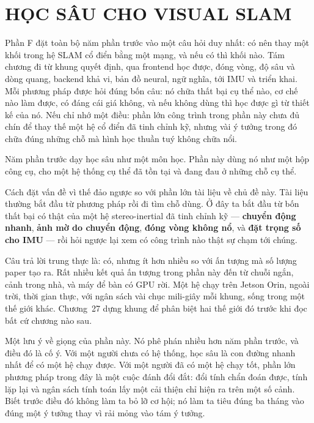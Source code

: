 \documentclass[../deep_learning.tex]{subfiles}
\begin{document}
\part{HỌC SÂU CHO VISUAL SLAM}
\begin{tomtat}
Phần F đặt toàn bộ năm phần trước vào một câu hỏi duy nhất: có nên thay một khối trong hệ SLAM cổ điển bằng một mạng, và nếu có thì khối nào. Tám chương đi từ khung quyết định, qua frontend học được, đóng vòng, độ sâu và dòng quang, backend khả vi, bản đồ neural, ngữ nghĩa, tới IMU và triển khai. Mỗi phương pháp được hỏi đúng bốn câu: nó chữa thất bại cụ thể nào, cơ chế nào làm được, có đáng cái giá không, và nếu không dùng thì học được gì từ thiết kế của nó. Nếu chỉ nhớ một điều: phần lớn công trình trong phần này chưa đủ chín để thay thế một hệ cổ điển đã tinh chỉnh kỹ, nhưng vài ý tưởng trong đó chữa đúng những chỗ mà hình học thuần tuý không chữa nổi.
\end{tomtat}

Năm phần trước dạy học sâu như một môn học. Phần này dùng nó như một hộp công cụ, cho một hệ thống cụ thể đã tồn tại và đang đau ở những chỗ cụ thể.

Cách đặt vấn đề vì thế đảo ngược so với phần lớn tài liệu về chủ đề này. Tài liệu thường bắt đầu từ phương pháp rồi đi tìm chỗ dùng. Ở đây ta bắt đầu từ bốn thất bại có thật của một hệ stereo-inertial đã tinh chỉnh kỹ --- \textbf{chuyển động nhanh}, \textbf{ảnh mờ do chuyển động}, \textbf{đóng vòng không nổ}, và \textbf{đặt trọng số cho IMU} --- rồi hỏi ngược lại xem có công trình nào thật sự chạm tới chúng.

Câu trả lời trung thực là: có, nhưng ít hơn nhiều so với ấn tượng mà số lượng paper tạo ra. Rất nhiều kết quả ấn tượng trong phần này đến từ chuỗi ngắn, cảnh trong nhà, và máy để bàn có GPU rời. Một hệ chạy trên Jetson Orin, ngoài trời, thời gian thực, với ngân sách vài chục mili-giây mỗi khung, sống trong một thế giới khác. Chương~27 dựng khung để phân biệt hai thế giới đó trước khi đọc bất cứ chương nào sau.

Một lưu ý về giọng của phần này. Nó phê phán nhiều hơn năm phần trước, và điều đó là cố ý. Với một người chưa có hệ thống, học sâu là con đường nhanh nhất để có một hệ chạy được. Với một người đã có một hệ chạy tốt, phần lớn phương pháp trong đây là một cuộc đánh đổi đắt: đổi tính chẩn đoán được, tính lặp lại và ngân sách tính toán lấy một cải thiện chỉ hiện ra trên một số cảnh. Biết trước điều đó không làm ta bỏ lỡ cơ hội; nó làm ta tiêu đúng ba tháng vào đúng một ý tưởng thay vì rải mỏng vào tám ý tưởng.









\ifSubfilesClassLoaded{\printbibliography[title={Nguồn}]}{}
\end{document}

